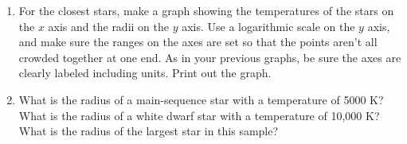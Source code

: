 \begin{enumerate}
\item For the
closest stars, make a graph showing the temperatures of the stars on the $x$
axis and the radii on the $y$ axis.  Use a logarithmic scale on the
$y$ axis, and make sure the ranges on the axes are set so that the points
aren't all crowded together at one end.  As in your previous graphs,
be sure the axes are clearly labeled including units.
Print out the graph.

\item What is the radius of a main-sequence star with a temperature of 5000 K?
What is the radius of a white dwarf star with a temperature of 10,000 K?
What is the radius of the largest star in this sample?

\vskip 1in


\end{enumerate}




